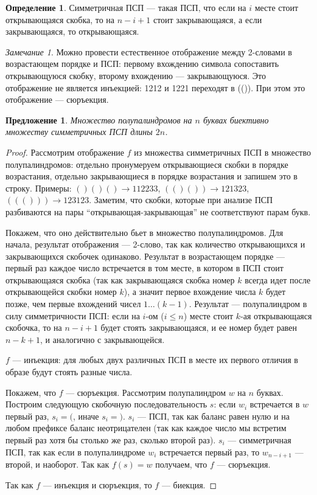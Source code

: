 \documentclass[a4paper,fleqn,12pt,top=0pt]{article}
\theoremstyle{plain}
\newtheorem{proposition}[theorem]{Предложение}
\theoremstyle{definition}
\newtheorem{definition}[theorem]{Определение}
\theoremstyle{remark}
\newtheorem{remark}[theorem]{Замечание}
\begin{document}
\begin{definition}
    Симметричная ПСП --- такая ПСП, что если на $i$ месте стоит открывающаяся скобка, то на $n - i + 1$ стоит закрывающаяся, а если закрывающаяся, то открывающаяся.
\end{definition}

\begin{remark}
    Можно провести естественное отображение между 2-словами в возрастающем порядке и ПСП: первому вхождению символа сопоставить открывающуюся скобку, второму вхождению --- закрывающуюся. Это отображение не является инъекцией: 1212 и 1221 переходят в (()). При этом это отображение --- сюръекция.
\end{remark}

\begin{proposition}\label{semi_bijective_cps}
    Множество полупалиндромов на $n$ буквах биективно множеству симметричных ПСП длины $2n$.
\end{proposition}

\begin{proof}
    Рассмотрим отображение $f$ из множества симметричных ПСП в множество полупалиндромов: отдельно пронумеруем открывающиеся скобки в порядке возрастания, отдельно закрывающиеся в порядке возрастания и запишем это в строку. Примеры: $()()() \rightarrow 112233$, $(()()) \rightarrow 121323$,$((())) \rightarrow 123123$. Заметим, что скобки, которые при анализе ПСП разбиваются на пары ``открывающая-закрывающая'' не соответствуют парам букв.
    
    Покажем, что оно действительно бьет в множество полупалиндромов. Для начала, результат отображения --- 2-слово, так как количество открывающихся и закрывающихся скобочек одинаково. Результат в возрастающем порядке --- первый раз каждое число встречается в том месте, в котором в ПСП стоит открывающаяся скобка (так как закрывающаяся скобка номер $k$ всегда идет после открывающейся скобки номер $k$), а значит первое вхождение числа $k$ будет позже, чем первые вхождений чисел $1 \dots (k-1)$. Результат --- полупалиндром в силу симметричности ПСП: если на $i$-ом ($i \le n$) месте стоит $k$-ая открывающаяся скобочка, то на $n - i + 1$ будет стоять закрывающаяся, и ее номер будет равен $n - k + 1$, и аналогично с закрывающейся.

    $f$ --- инъекция: для любых двух различных ПСП в месте их первого отличия в образе будут стоять разные числа.

    Покажем, что $f$ --- сюръекция. Рассмотрим полупалиндром $w$ на $n$ буквах. Построим следующую скобочную последовательность $s$: если $w_i$ встречается в $w$ первый раз, $s_i = ($, иначе $s_i = )$. $s_i$ --- ПСП, так как баланс равен нулю и на любом префиксе баланс неотрицателен (так как каждое число мы встретим первый раз хотя бы столько же раз, сколько второй раз). $s_i$ --- симметричная ПСП, так как если в полупалиндроме $w_i$ встречается первый раз, то $w_{n - i + 1}$ --- второй, и наоборот. Так как  $f(s) = w$ получаем, что $f$ --- сюръекция.

    Так как $f$ --- инъекция и сюръекция, то $f$ --- биекция.
\end{proof}
\end{document}
